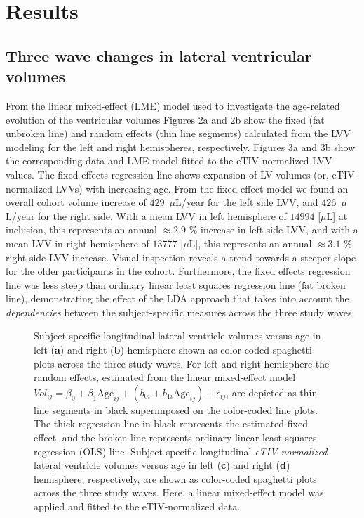 \documentclass[10pt,letterpaper]{article}
\begin{document}
\section{Results}

\subsection {Three wave changes in lateral ventricular volumes}

From the linear mixed-effect (LME) model used to investigate the age-related evolution of the ventricular volumes Figures 2a and 2b show the fixed (fat unbroken line) and random effects (thin line segments) calculated from the LVV modeling for the left and right hemispheres, respectively.
Figures 3a and 3b show the corresponding data and LME-model fitted to the eTIV-normalized LVV values.
The fixed effects regression line shows expansion of LV volumes (or, eTIV-normalized LVVs) with increasing age. From the fixed effect model we found an overall cohort volume increase of $429$~$\mu$L/year 
for the left side LVV, and $426$~$\mu$L/year 
for the right side. With a mean LVV in left hemisphere of $14994$ [$\mu$L] at inclusion, this represents
an annual $\approx2.9$ \% increase in left side LVV, and with a mean LVV in right hemisphere of $13777$ [$\mu$L], this represents an annual $\approx3.1$ \% right side LVV increase. 
Visual inspection reveals a trend towards a steeper slope for the older participants in the cohort. Furthermore, the fixed effects regression line was less steep than ordinary linear least squares regression line (fat broken line), demonstrating the effect of the LDA approach that takes into account the {\it dependencies} between the subject-specific measures across the three study waves. 


\vspace{3mm}
\begin{figure}[H]
\caption{
 Subject-specific longitudinal lateral ventricle volumes versus age in left ({\bf a}) and right ({\bf b}) hemisphere shown as color-coded spaghetti plots across the three study waves. For left and right hemisphere the random effects, estimated from the linear mixed-effect model $Vol_{ij} = \beta_0 + \beta_1 \mbox{Age}_{ij} + (b_{0i} + b_{1i} \mbox{Age}_{ij}) + \epsilon_{ij}$, are depicted as thin line segments in black superimposed on the color-coded line plots. The thick regression line in black represents the estimated fixed effect, and the broken line represents ordinary linear least squares regression (OLS) line.
Subject-specific longitudinal {\it eTIV-normalized} lateral ventricle volumes versus age in left ({\bf c}) and right ({\bf d}) hemisphere, respectively, are shown as color-coded spaghetti plots across the three study waves. Here, a linear mixed-effect model was applied and fitted to the eTIV-normalized data.\\}
\label{fig 3}
\end{figure}
\vspace{3mm}
\end{document}
